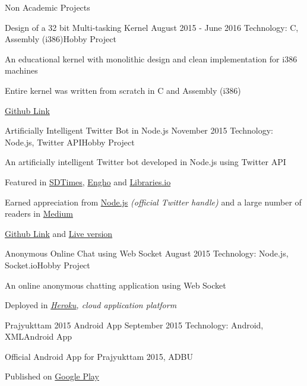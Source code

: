 \documentclass{resume}
\begin{document}
\begin{rSection}{Non Academic Projects}
	
	\begin{rSubsection}{Design of a 32 bit Multi-tasking Kernel} {August 2015 - June 2016}
		{Technology: C, Assembly (i386)}{Hobby Project}
		\item An educational kernel with monolithic design and clean implementation for i386 machines
		\item Entire kernel was written from scratch in C and Assembly (i386)
		\item \href{https://github.com/debashisbarman/minios}{Github Link}
	\end{rSubsection}
	    
	\begin{rSubsection}{Artificially Intelligent Twitter Bot in Node.js} {November 2015}
		{Technology: Node.js, Twitter API}{Hobby Project}
		\item An artificially intelligent Twitter bot developed in Node.js using Twitter API
		\item Featured in \href{https://sdtimes.com/nim-e-book-now-available-google-and-movidius-team-up-on-deep-learning-and-creating-a-twitter-bot-with-node-js-sd-times-news-digest-jan-28-2016/}{SDTimes}, \href{http://www.enhgo.com/code/program-a-twitter-bot/}{Engho} and \href{https://libraries.io/github/debashisbarman/Sofia}{Libraries.io}
		\item Earned appreciation from \href{https://twitter.com/nodejs/status/692736895374102528}{Node.js} \textit{(official Twitter handle)} and a large number of readers in \href{https://medium.com/@DebashisBarman/creating-a-twitter-bot-with-node-js-bea760b80bd5}{Medium}
		\item \href{https://gist.github.com/debashisbarman/bffe0f6cd3c0fd2fe40e}{Github Link} and \href{https://twitter.com/digitalsofia}{Live version}
	\end{rSubsection}
	    
	\begin{rSubsection}{Anonymous Online Chat using Web Socket} {August 2015}
		{Technology: Node.js, Socket.io}{Hobby Project}
		\item An online anonymous chatting application using Web Socket
		\item Deployed in \textit{\href{http://adda.herokuapp.com/}{Heroku}, cloud application platform}
	\end{rSubsection}
	
	\begin{rSubsection}{Prajyukttam 2015 Android App} {September 2015}
		{Technology: Android, XML}{Android App}
		\item Official Android App for Prajyukttam 2015, ADBU
		\item Published on \href{https://play.google.com/store/apps/details?id=in.edu.dbu.prajyukttam.prajyukttam2015}{Google Play}
	\end{rSubsection}
	    
\end{rSection}
\end{document}
